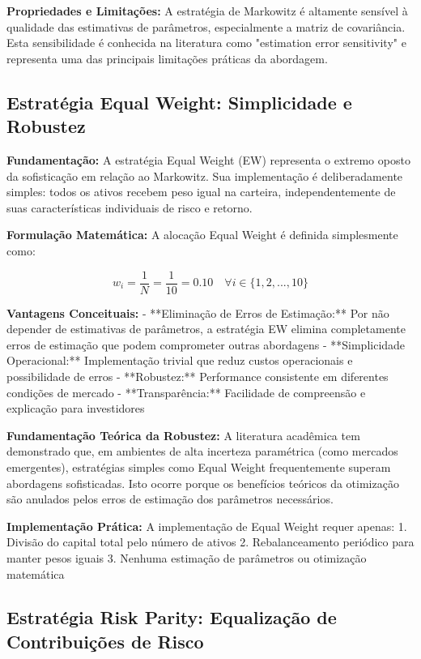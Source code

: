 \textbf{Propriedades e Limitações:} A estratégia de Markowitz é altamente sensível à qualidade das estimativas de parâmetros, especialmente a matriz de covariância. Esta sensibilidade é conhecida na literatura como "estimation error sensitivity" e representa uma das principais limitações práticas da abordagem.

\subsection{Estratégia Equal Weight: Simplicidade e Robustez}

\textbf{Fundamentação:} A estratégia Equal Weight (EW) representa o extremo oposto da sofisticação em relação ao Markowitz. Sua implementação é deliberadamente simples: todos os ativos recebem peso igual na carteira, independentemente de suas características individuais de risco e retorno.

\textbf{Formulação Matemática:} A alocação Equal Weight é definida simplesmente como:

\begin{equation}
w_i = \frac{1}{N} = \frac{1}{10} = 0.10 \quad \forall i \in \{1, 2, ..., 10\}
\end{equation}

\textbf{Vantagens Conceituais:}
- **Eliminação de Erros de Estimação:** Por não depender de estimativas de parâmetros, a estratégia EW elimina completamente erros de estimação que podem comprometer outras abordagens
- **Simplicidade Operacional:** Implementação trivial que reduz custos operacionais e possibilidade de erros
- **Robustez:** Performance consistente em diferentes condições de mercado
- **Transparência:** Facilidade de compreensão e explicação para investidores

\textbf{Fundamentação Teórica da Robustez:} A literatura acadêmica tem demonstrado que, em ambientes de alta incerteza paramétrica (como mercados emergentes), estratégias simples como Equal Weight frequentemente superam abordagens sofisticadas. Isto ocorre porque os benefícios teóricos da otimização são anulados pelos erros de estimação dos parâmetros necessários.

\textbf{Implementação Prática:} A implementação de Equal Weight requer apenas:
1. Divisão do capital total pelo número de ativos
2. Rebalanceamento periódico para manter pesos iguais
3. Nenhuma estimação de parâmetros ou otimização matemática

\subsection{Estratégia Risk Parity: Equalização de Contribuições de Risco}

